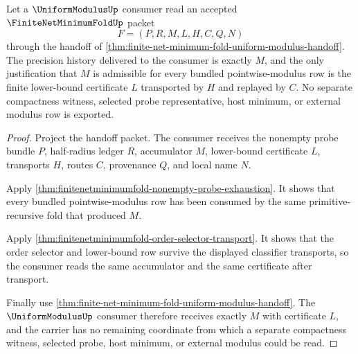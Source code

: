 \begin{theorem}
\label{thm:finitenetminimumfold-modulus-consumer-exactness}
Let a $\UniformModulusUp$ consumer read an accepted $\FiniteNetMinimumFoldUp$ packet
$$
F=(P,R,M,L,H,C,Q,N)
$$
through the handoff of \autoref{thm:finite-net-minimum-fold-uniform-modulus-handoff}. The precision history delivered to the consumer is exactly $M$, and the only justification that $M$ is admissible for every bundled pointwise-modulus row is the finite lower-bound certificate $L$ transported by $H$ and replayed by $C$. No separate compactness witness, selected probe representative, host minimum, or external modulus row is exported.
\end{theorem}
\begin{proof}
Project the handoff packet. The consumer receives the nonempty probe bundle $P$, half-radius ledger $R$, accumulator $M$, lower-bound certificate $L$, transports $H$, routes $C$, provenance $Q$, and local name $N$.

Apply \autoref{thm:finitenetminimumfold-nonempty-probe-exhaustion}. It shows that every bundled pointwise-modulus row has been consumed by the same primitive-recursive fold that produced $M$.

Apply \autoref{thm:finitenetminimumfold-order-selector-transport}. It shows that the order selector and lower-bound row survive the displayed classifier transports, so the consumer reads the same accumulator and the same certificate after transport.

Finally use \autoref{thm:finite-net-minimum-fold-uniform-modulus-handoff}. The $\UniformModulusUp$ consumer therefore receives exactly $M$ with certificate $L$, and the carrier has no remaining coordinate from which a separate compactness witness, selected probe, host minimum, or external modulus could be read.
\end{proof}

